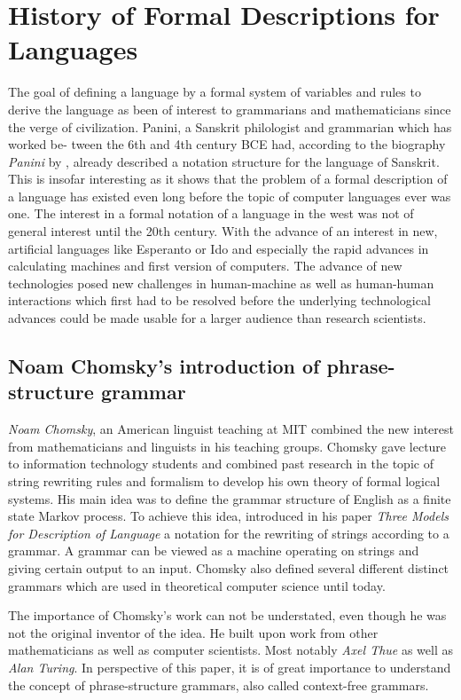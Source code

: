 \documentclass{article}
\begin{document}
\section{History of Formal Descriptions for Languages}
The goal of defining a language by a formal system of variables and rules to derive the language as been of interest to grammarians and mathematicians since the verge of civilization. Panini, a Sanskrit philologist and grammarian which has worked be- tween the 6th and 4th century BCE had, according to the biography \textit{Panini} by \citet{bhate2002panini}, already described a notation structure for the language of Sanskrit. This is insofar interesting as it shows that the problem of a formal description of a language has existed even long before the topic of computer languages ever was one. The interest in a formal notation of a language in the west was not of general interest until the 20th century. With the advance of an interest in new, artificial languages like Esperanto or Ido and especially the rapid advances in calculating machines and first version of computers. The advance of new technologies posed new challenges in human-machine as well as human-human interactions which first had to be resolved before the underlying technological advances could be made usable for a larger audience than research scientists.

\subsection{Noam Chomsky's introduction of phrase-structure grammar}
\textit{Noam Chomsky}, an American linguist teaching at MIT combined the new interest from mathematicians and linguists in his teaching groups. Chomsky gave lecture to information technology students and combined past research in the topic of string rewriting rules and formalism to develop his own theory of formal logical systems. His main idea was to define the grammar structure of English as a finite state Markov process. To achieve this idea, \citet{1056813} introduced in his paper \textit{Three Models for Description of Language} a notation for the rewriting of strings according to a grammar. A grammar can be viewed as a machine operating on strings and giving certain output to an input. Chomsky also defined several different distinct grammars which are used in theoretical computer science until today.

The importance of Chomsky’s work can not be understated, even though he was not the original inventor of the idea. He built upon work from other mathematicians as well as computer scientists. Most notably \textit{Axel Thue} as well as \textit{Alan Turing}. In perspective of this paper, it is of great importance to understand the concept of phrase-structure grammars, also called context-free grammars.
\end{document}
